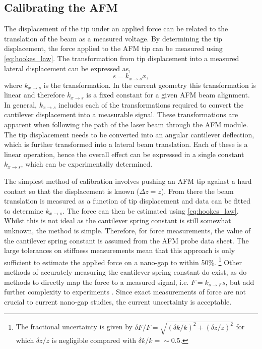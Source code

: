 \documentclass{article}
\begin{document}
\subsection{Calibrating the AFM}

The displacement of the tip under an applied force can be related to the translation of the beam as a measured voltage. By determining the tip displacement, the force applied to the AFM tip can be measured using \eqref{eq:hookes_law}. The transformation from tip displacement into a measured lateral displacement can be expressed as,
\begin{equation}
s = k_{x \rightarrow s}x,
\end{equation}
where $k_{x \rightarrow s}$ is the transformation. In the current geometry this transformation is linear and therefore $k_{x \rightarrow s}$ is a fixed constant for a given AFM beam alignment. In general, $k_{x \rightarrow s}$ includes each of the transformations required to convert the cantilever displacement into a measurable signal. These transformations are apparent when following the path of the laser beam through the AFM module. The tip displacement needs to be converted into an angular cantilever deflection, which is further transformed into a lateral beam translation. Each of these is a linear operation, hence the overall effect can be expressed in a single constant $k_{x \rightarrow s}$, which can be experimentally determined.

The simplest method of calibration involves pushing an AFM tip against a hard contact so that the displacement is known ($\Delta z = z$). From there the beam translation is measured as a function of tip displacement and data can be fitted to determine $k_{x \rightarrow s}$. The force can then be estimated using \eqref{eq:hookes_law}. Whilst this is not ideal as the cantilever spring constant is still somewhat unknown, the method is simple. Therefore, for force measurements, the value of the cantilever spring constant is assumed from the AFM probe data sheet. The large tolerances on stiffness measurements mean that this approach is only sufficient to estimate the applied force on a nano-gap to within 50\%.%
\footnote{The fractional uncertainty is given by  $\delta F/F = \sqrt{(\delta k/k)^2+(\delta z/z)^2}$ for which $\delta z/z$ is negligible compared with $\delta k/k=\sim0.5$.}
Other methods of accurately measuring the cantilever spring constant do exist, as do methods to directly map the force to a measured signal, i.e. $F = k_{s \rightarrow F}s$, but add further complexity to experiments \cite{hutter1993calibration, senden1994experimental, torii1996method, sader1999calibration, levy2002measuring, cumpson2004quantitative, gates2007precise, langlois2007spring, ohler2007cantilever}. Since exact measurements of force are not crucial to current nano-gap studies, the current uncertainty is acceptable.

\FloatBarrier
\end{document}
